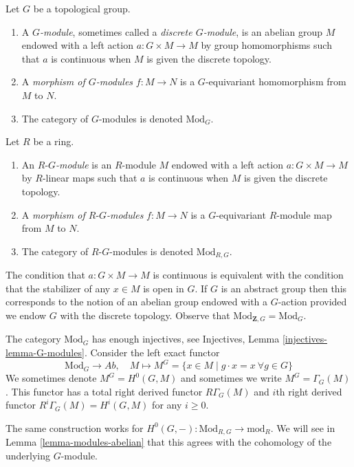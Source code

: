 \begin{definition}
\label{definition-G-module-continuous}
Let $G$ be a topological group.
\begin{enumerate}
\item A {\it $G$-module}, sometimes called a {\it discrete $G$-module},
is an abelian group $M$ endowed with a left action $a : G \times M \to M$
by group homomorphisms such that $a$ is continuous when $M$ is given the
discrete topology.
\item A {\it morphism of $G$-modules} $f : M \to N$ is a
$G$-equivariant homomorphism from $M$ to $N$.
\item The category of $G$-modules is denoted $\text{Mod}_G$.
\end{enumerate}
Let $R$ be a ring.
\begin{enumerate}
\item An {\it $R\text{-}G$-module} is an $R$-module $M$ endowed with
a left action $a : G \times M \to M$ by $R$-linear maps such that $a$
is continuous when $M$ is given the discrete topology.
\item A {\it morphism of $R\text{-}G$-modules} $f : M \to N$ is a
$G$-equivariant $R$-module map from $M$ to $N$.
\item The category of $R\text{-}G$-modules is denoted $\text{Mod}_{R, G}$.
\end{enumerate}
\end{definition}

\noindent
The condition that $a : G \times M \to M$ is continuous is equivalent
with the condition that the stabilizer of any $x \in M$ is open in $G$.
If $G$ is an abstract group then this corresponds to the notion of an
abelian group endowed with a $G$-action provided we endow $G$ with the
discrete topology. Observe that $\text{Mod}_{\mathbf{Z}, G} = \text{Mod}_G$.

\medskip\noindent
The category $\text{Mod}_G$ has enough injectives, see
Injectives, Lemma \ref{injectives-lemma-G-modules}.
Consider the left exact functor
$$
\text{Mod}_G \longrightarrow \textit{Ab},
\quad
M \longmapsto M^G =
\{x \in M \mid g \cdot x = x\ \forall g \in G\}
$$
We sometimes denote $M^G = H^0(G, M)$ and sometimes we write
$M^G = \Gamma_G(M)$. This functor has a total right derived functor
$R\Gamma_G(M)$ and $i$th right derived functor
$R^i\Gamma_G(M) = H^i(G, M)$ for any $i \geq 0$.

\medskip\noindent
The same construction works for
$H^0(G, -) : \text{Mod}_{R, G} \to \text{mod}_R$. We will see in
Lemma \ref{lemma-modules-abelian} that this agrees with the cohomology
of the underlying $G$-module.


